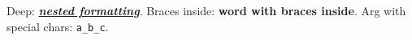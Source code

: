 \documentclass{article}
\begin{document}
Deep: \textbf{\textit{\underline{nested formatting}}}.
Braces inside: \textbf{word {with braces} inside}.
Arg with special chars: \texttt{a\_b\_c}.
\end{document}
